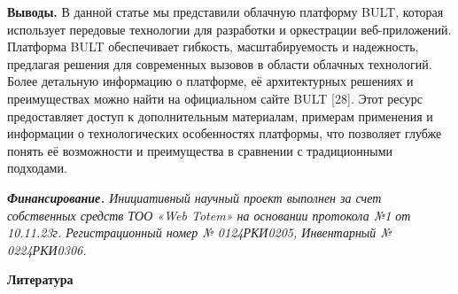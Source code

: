 \begin{multicols}{2}
{\bfseries Выводы.} В данной статье мы представили облачную платформу BULT,
которая использует передовые технологии для разработки и оркестрации
веб-приложений. Платформа BULT обеспечивает гибкость, масштабируемость и
надежность, предлагая решения для современных вызовов в области облачных
технологий. Более детальную информацию о платформе, её архитектурных
решениях и преимуществах можно найти на официальном сайте BULT {[}28{]}.
Этот ресурс предоставляет доступ к дополнительным материалам, примерам
применения и информации о технологических особенностях платформы, что
позволяет глубже понять её возможности и преимущества в сравнении с
традиционными подходами.

\emph{{\bfseries Финансирование.} Инициативный научный проект выполнен за
счет собственных средств ТОО «Web Totem» на основании протокола №1 от
10.11.23г. Регистрационный номер № 0124РКИ0205, Инвентарный №
0224РКИ0306.}
\end{multicols}

\begin{center}
{\bfseries Литература}
\end{center}

